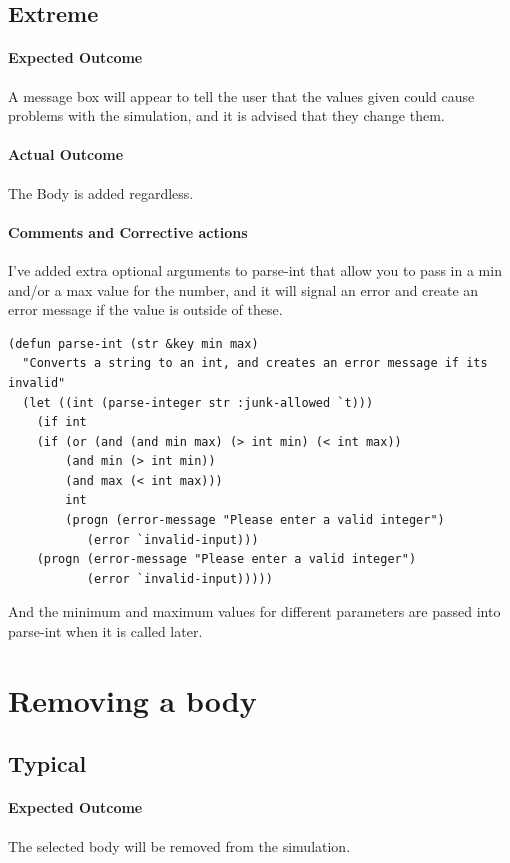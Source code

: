 \subsection{Extreme}
\paragraph{Expected Outcome}
A message box will appear to tell the user that the values given could cause
problems with the simulation, and it is advised that they change them.
\paragraph{Actual Outcome}
The Body is added regardless.
\paragraph{Comments and Corrective actions}
I've added extra optional arguments to parse-int that allow you to pass in a min
and/or a max value for the number, and it will signal an error and create an
error message if the value is outside of these.
\begin{lstlisting}
(defun parse-int (str &key min max)
  "Converts a string to an int, and creates an error message if its invalid"
  (let ((int (parse-integer str :junk-allowed `t)))
    (if int
	(if (or (and (and min max) (> int min) (< int max))
		(and min (> int min))
		(and max (< int max)))
	    int
	    (progn (error-message "Please enter a valid integer")
		   (error `invalid-input)))
	(progn (error-message "Please enter a valid integer")
	       (error `invalid-input)))))
\end{lstlisting}
And the minimum and maximum values for different parameters are passed into
parse-int when it is called later.

\section{Removing a body}
\subsection{Typical}
\paragraph{Expected Outcome}
The selected body will be removed from the simulation.
